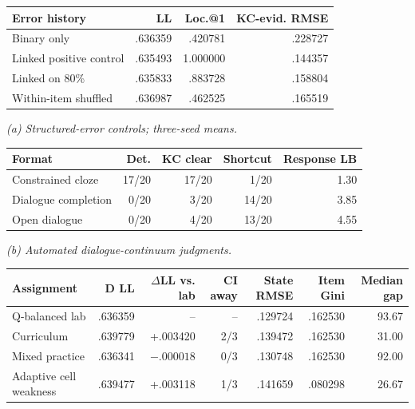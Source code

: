 \begin{table}[t]
  \centering
  \footnotesize
  \setlength{\tabcolsep}{3pt}
  \begin{minipage}[t]{.46\textwidth}
    \centering
    \begin{tabularx}{\linewidth}{@{}Xrrr@{}}
      \toprule
      Error history & LL & Loc.@1 & KC-evid. RMSE \\
      \midrule
      Binary only & .636359 & .420781 & .228727 \\
      Linked positive control & .635493 & 1.000000 & .144357 \\
      Linked on 80\% & .635833 & .883728 & .158804 \\
      Within-item shuffled & .636987 & .462525 & .165519 \\
      \bottomrule
    \end{tabularx}

    \vspace{2pt}
    \emph{(a) Structured-error controls; three-seed means.}
  \end{minipage}\hfill
  \begin{minipage}[t]{.51\textwidth}
    \centering
    \begin{tabularx}{\linewidth}{@{}Xrrrr@{}}
      \toprule
      Format & Det. & KC clear & Shortcut & Response LB \\
      \midrule
      Constrained cloze & 17/20 & 17/20 & 1/20 & 1.30 \\
      Dialogue completion & 0/20 & 3/20 & 14/20 & 3.85 \\
      Open dialogue & 0/20 & 4/20 & 13/20 & 4.55 \\
      \bottomrule
    \end{tabularx}

    \vspace{2pt}
    \emph{(b) Automated dialogue-continuum judgments.}
  \end{minipage}

  \vspace{5pt}
  \begin{tabularx}{\textwidth}{@{}Xrrrrrr@{}}
    \toprule
    Assignment & D LL & $\Delta$LL vs. lab & CI away & State RMSE & Item Gini & Median gap \\
    \midrule
    Q-balanced lab & .636359 & -- & -- & .129724 & .162530 & 93.67 \\
    Curriculum & .639779 & +.003420 & 2/3 & .139472 & .162530 & 31.00 \\
    Mixed practice & .636341 & $-.000018$ & 0/3 & .130748 & .162530 & 92.00 \\
    Adaptive cell weakness & .639477 & +.003118 & 1/3 & .141659 & .080298 & 26.67 \\
    \bottomrule
  \end{tabularx}


\end{table}
